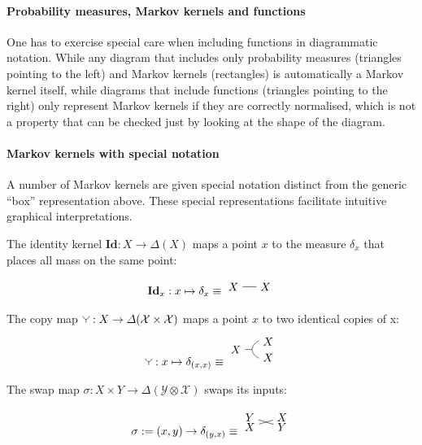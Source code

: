 \paragraph{Probability measures, Markov kernels and functions}

One has to exercise special care when including functions in diagrammatic notation. While any diagram that includes only probability measures (triangles pointing to the left) and Markov kernels (rectangles) is automatically a Markov kernel itself, while diagrams that include functions (triangles pointing to the right) only represent Markov kernels if they are correctly normalised, which is not a property that can be checked just by looking at the shape of the diagram.

\paragraph{Markov kernels with special notation}

A number of Markov kernels are given special notation distinct from the generic ``box'' representation above. These special representations facilitate intuitive graphical interpretations.

The identity kernel $\textbf{Id}:X\to \Delta(X)$ maps a point $x$ to the measure $\delta_x$ that places all mass on the same point:

\begin{align}
\textbf{Id}_x : x\mapsto \delta_x \equiv \begin{tikzpicture}\path (0,0) node (X) {$X$} + (1,0) node (X1) {$X$}; \draw (X)--(X1); \end{tikzpicture}\label{eq:identity}
\end{align}


The copy map $\splitter{0.1}:X\to \Delta(\mathcal{X}\times \mathcal{X})$ maps a point $x$ to two identical copies of x:
\begin{align}
 \splitter{0.1}: x\mapsto \delta_{(x,x)} \equiv \begin{tikzpicture}
 \path (0,0) node (X) {$X$} ++ (0.5,0) coordinate (copy0) ++ (0.5,0.25) node (X1) {$X$} ++(0,-0.5) node (X2) {$X$};\draw (X)--(copy0) to [bend left] (X1) (copy0) to [bend right] (X2);
 \end{tikzpicture}\label{eq:copy}
 \end{align} 


The swap map $\sigma:X\times Y\to \Delta(\mathcal{Y}\otimes\mathcal{X})$ swaps its inputs:

\begin{align}
\sigma := (x,y)\to \delta_{(y,x)} \equiv \begin{tikzpicture}
\path (0,0) node (X) {$X$}
+(1,0.3) node (X1) {$X$}
(0,0.3) node (Y) {$Y$}
+(1,-0.3) node (Y1) {$Y$};
\draw (X)--(X1) (Y) -- (Y1);
\end{tikzpicture}\label{eq:swap}
\end{align}

